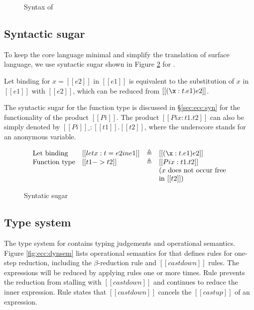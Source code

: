 \begin{figure}[ht]
	\gram{\ottee\ottinterrule
		\otts\ottinterrule
		\ottG\ottinterrule
		\ottv}
	\caption{Syntax of \expcc}
	\label{fig:ecc:syntax}
\end{figure}

\subsection{Syntactic sugar}

To keep the core language minimal and simplify the translation of surface language, we use syntactic sugar shown in Figure \ref{fig:ecc:sugar} for \expcc.

Let binding for $x=[[e2]]$ in $[[e1]]$ is equivalent to the substitution of $x$ in $[[e1]]$ with $[[e2]]$, which can be reduced from $[[(\x:t.e1)e2]]$.

The syntactic sugar for the function type is discussed in \S \ref{sec:ecc:syn} for the functionality of the product $[[Pi]]$. The product $[[Pi x:t1.t2]]$ can also be simply denoted by $[[Pi]] \_ : [[t1]] . [[t2]]$, where the underscore stands for an anonymous variable.

\begin{figure}[ht]
	\centering
	\[
	\begin{array}{llll}
	\text{Let binding} & [[let x : t = e2 in e1]] & \triangleq & [[(\x:t.e1)e2]] \\
	\text{Function type} & [[t1->t2]] & \triangleq & [[Pi x:t1.t2]]\\
	&&& \text{($x$ does not occur free}\\
	&&& \text{in $[[t2]]$)}
	\end{array}
	\]
	\caption{Syntatic sugar}
	\label{fig:ecc:sugar}
\end{figure}

\subsection{Type system}\label{sec:ecc:type}
The type system for \expcc contains typing judgements and operational semantics. Figure \ref{fig:ecc:dynsem} lists operational semantics for \expcc that defines rules for one-step reduction, including the $\beta$-reduction rule and $[[castdown]]$ rules. The expressions will be reduced by applying rules one or more times. Rule  prevents the reduction from stalling with $[[castdown]]$ and continues to reduce the inner expression. Rule  states that $[[castdown]]$ cancels the $[[castup]]$ of an expression.

